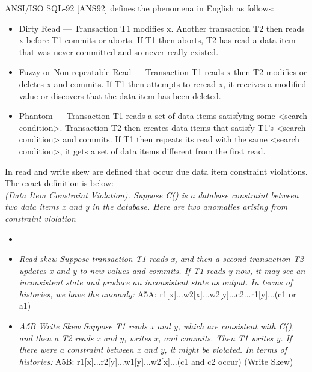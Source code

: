 \documentclass[a4paper,10pt,titlepage]{report}
\begin{document}
    ANSI/ISO SQL-92 [ANS92] defines the phenomena in English as follows:
    \begin{itemize}
        \item Dirty Read — Transaction T1 modifies x. Another transaction T2 then reads x before T1 commits or aborts. If T1 then aborts, T2 has read a data item that was never committed and so never really existed.
        \item Fuzzy or Non-repeatable Read — Transaction T1 reads x then T2 modifies or deletes x and commits. If T1 then attempts to reread x, it receives a modified value or discovers that the data item has been deleted.
        \item Phantom — Transaction T1 reads a set of data items satisfying some <search condition>. Transaction T2 then creates data items that satisfy T1's <search condition> and commits. If T1 then repeats its read with the same <search condition>, it gets a set of data items different from the first read.
    \end{itemize}


    In \cite{Berensonetal} read and write skew are defined that occur due data item constraint violations. The exact definition is below: \\

    \textit{(Data Item Constraint Violation). Suppose C() is a database constraint between two data items x and y in the database. Here are two anomalies arising from constraint violation}

    \begin{itemize}
        \item
        \item \textit{Read skew Suppose transaction T1 reads x, and then a second transaction T2 updates x and y to new values and commits. If T1 reads y now, it may see an inconsistent state and produce an inconsistent state as output.
        In terms of histories, we have the anomaly:  }
        A5A: r1[x]...w2[x]...w2[y]...c2...r1[y]...(c1 or a1)
        \item \textit{A5B Write Skew Suppose T1 reads x and y, which are
        consistent with C(), and then a T2 reads x and y, writes x,
            and commits. Then T1 writes y. If there were a constraint
            between x and y, it might be violated. In terms of histories:}
        A5B: r1[x]...r2[y]...w1[y]...w2[x]...(c1 and c2 occur)
        (Write Skew)
    \end{itemize}
\end{document}
